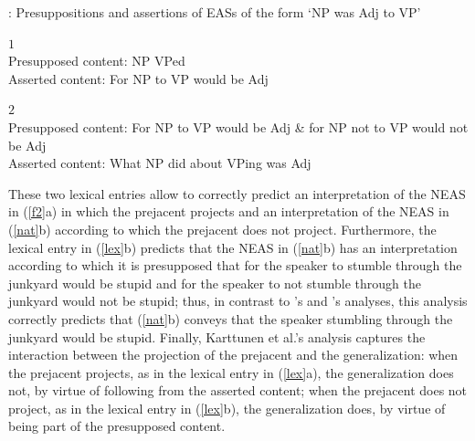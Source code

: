 \documentclass[11pt,fleqn]{article}
\newcommand{\6}{\mbox{$[\hspace*{-.6mm}[$}}
\newcommand{\9}{\mbox{$]\hspace*{-.6mm}]$}}
\newcommand{\citepos}[1]{\citeauthor{#1}'s \citeyear{#1}}
\begin{document}
\begin{exe}
\ex\label{lex} \citealt[249]{karttunen-etal2014}: Presuppositions and assertions of EASs of the form `NP was Adj to VP'
\begin{xlist}
$ 1$
\\ Presupposed content: NP VPed
\\ Asserted content: For NP to VP would be Adj

$ 2$
\\ Presupposed content: For NP to VP would be Adj \& for NP not to VP would not be Adj
\\ Asserted content: What NP did about VPing was Adj





\end{xlist}
\end{exe}
These two lexical entries allow \citealt{karttunen-etal2014} to correctly predict an interpretation of the NEAS in (\ref{f2}a) in which the prejacent projects and an interpretation of the NEAS in (\ref{nat}b) according to which the prejacent does not project. Furthermore, the lexical entry in (\ref{lex}b) predicts that the NEAS in (\ref{nat}b) has an interpretation according to which it is presupposed that for the speaker to stumble through the junkyard would be stupid and for the speaker to not stumble through the junkyard would not be stupid; thus, in contrast to \citepos{oshima09b} and \citepos{barker02} analyses, this analysis correctly predicts that (\ref{nat}b) conveys that the speaker stumbling through the junkyard would be stupid. Finally, Karttunen et al.'s analysis captures the interaction between the projection of the prejacent and the generalization: when the prejacent projects, as in the lexical entry in (\ref{lex}a), the generalization does not, by virtue of following from the asserted content;  when the prejacent does not project, as in the lexical entry in (\ref{lex}b), the generalization does, by virtue of being part of the presupposed content.
\end{document}
